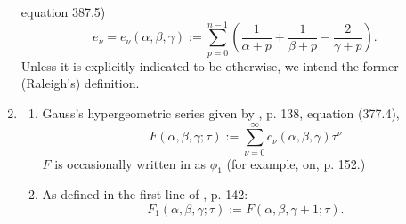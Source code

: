 \documentclass{article}
\begin{document}
\begin{enumerate}
equation 387.5)
$$
e_{\nu} = e_{\nu}(\alpha, \beta, \gamma) :=  
\sum_{p = 0}^{n - 1}
\left ( \frac 1{\alpha + p} + 
\frac 1{\beta + p} 
- \frac 2{\gamma + p} \right ).
$$ Unless it
is explicitly indicated to be
otherwise, we intend the former (Raleigh's)
definition.
\item 
\begin{enumerate}
    \item Gauss's hypergeometric series
given by \cite{caratheodory2}, p. 138,
equation (377.4),
$$
F(\alpha,\beta,\gamma;\tau):=
\sum_{{\nu}=0}^{\infty} 
c_{\nu}(\alpha, \beta, \gamma) \tau^{\nu}$$
$F$ is occasionally written in 
\cite{caratheodory2} as $\phi_1$ (for
example, on, p. 152.)
    \item As
    defined in the first line of
\cite{caratheodory2}, p. 142:
$$
F_1(\alpha,\beta,\gamma; \tau):=
F(\alpha,\beta,\gamma+1;\tau).
$$


\end{enumerate}
\end{enumerate}
\end{document}
